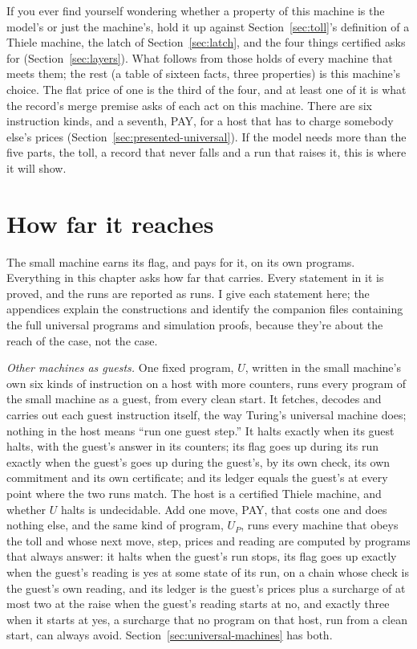 \documentclass[11pt,twoside]{article}
\theoremstyle{thielethm}
\theoremstyle{thieledef}
\theoremstyle{thieledef}
\theoremstyle{thieledef}
\theoremstyle{thielethm}
\theoremstyle{thieleobs}
\theoremstyle{thielethm}
\begin{document}
If you ever find yourself wondering whether a property of this machine is the model's or just the
machine's, hold it up against Section~\ref{sec:toll}'s definition of a Thiele machine, the latch of
Section~\ref{sec:latch}, and the four things certified asks for (Section~\ref{sec:layers}). What follows from those holds of
every machine that meets them; the rest (a table of sixteen facts, three properties) is this machine's choice. The flat price of one is the third of the four, and at least one of it is what the record's merge premise asks of each act on this machine. There are six instruction kinds, and a seventh, PAY, for a host that has to charge
somebody else's prices (Section~\ref{sec:presented-universal}). If the model needs more than the five parts, the toll, a record that never falls and a run that raises it, this is where it will show.

\section{How far it reaches}
\label{sec:reach}

The small machine earns its flag, and pays for it, on its own programs. Everything in this chapter
asks how far that carries. Every statement in it is proved, and the runs are reported as runs. I
give each statement here; the appendices explain the constructions and identify
the companion files containing the full universal programs and simulation proofs, because they're about the reach of the case, not the case.

\emph{Other machines as guests.} One fixed program, $U$, written in the small machine's own six kinds
of instruction on a host with more counters, runs every program of the small machine as a guest,
from every clean start. It fetches, decodes and carries out each guest instruction itself, the way
Turing's universal machine does; nothing in the host means ``run one guest step.'' It halts exactly
when its guest halts, with the guest's answer in its counters; its flag goes up during its run exactly when the
guest's goes up during the guest's, by its own check, its own commitment and its own certificate; and its ledger equals the
guest's at every point where the two runs match. The host is a certified Thiele machine, and whether $U$ halts
is undecidable. Add one move, PAY, that costs one and does nothing else, and the same kind of
program, $U_P$, runs every machine that obeys the toll and whose next move, step, prices and reading are computed by
programs that always answer: it halts when the guest's run stops, its flag goes up exactly when the
guest's reading is yes at some state of its run, on a chain whose check is the guest's own reading,
and its ledger is the guest's prices plus a surcharge of at most two at the raise when the guest's
reading starts at no, and exactly three when it starts at yes, a surcharge that no program on that host, run from a clean start, can always avoid. Section~\ref{sec:universal-machines} has both.
\end{document}
